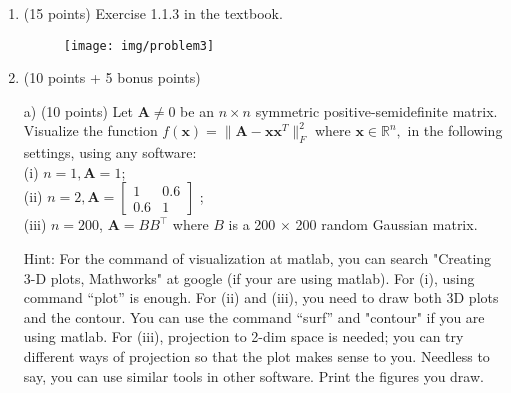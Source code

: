 \documentclass[11pt,letterpaper]{article}
\begin{document}
\begin{enumerate}
\newpage 

\item (15 points) Exercise 1.1.3 in the textbook. 

\begin{figure}[h]  \vspace{-0.4cm}
	\texttt{[image: img/problem3]}
\end{figure}




	\item (10 points + 5 bonus points) 
	
a)  (10 points) Let $\mathbf{A}\ne 0$ be an $n \times n $ symmetric positive-semidefinite matrix.
Visualize the function $f( \mathbf{x} ) = 
\| \mathbf{A} -\mathbf{x}\mathbf{x}^T \|_F^2 $ where 
$\mathbf{x}  \in\mathbb{R}^n, $
 in  the following settings, using any software: \\
  (i)  $ n = 1, \mathbf{A} = 1 $; \\
   (ii) $ n = 2, \mathbf{A} =  \begin{bmatrix}
   1 & 0.6 \\ 0.6 & 1
   \end{bmatrix} $ ;  \\ 
  (iii)  $ n = 200 $, $ \mathbf{A} =  B B^{\top }  $  where $B$ is  a 200 $\times $ 200 random Gaussian matrix. 

Hint: For the command of visualization at matlab, you can search "Creating 3-D plots, Mathworks" at google (if your 
are using matlab). For (i), using command ``plot'' is enough. 
For (ii) and (iii), you need to draw both 3D plots and the contour.
You can use the command ``surf'' and  "contour" if you are using matlab. 
For (iii), projection to 2-dim space is needed; you can try different ways of projection so that the plot makes sense
to you. 
Needless to say, you can use  similar tools in other software. 
Print the figures you draw. 



\end{enumerate}
\end{document}
